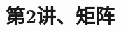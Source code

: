 \documentclass[10pt,a4paper%
tablecaptionabove]{article}
\begin{document}
\begin{CJK}{UTF8}{gkai}
  \pagestyle{plain}
  
  \renewcommand{\proofname}{\textbf{证明}}
  \renewcommand{\figurename}{\textbf{图}}

  

  \title{第2讲、矩阵}
  \maketitle

  
  
  
  
  
  
  
\end{CJK}
\end{document}
